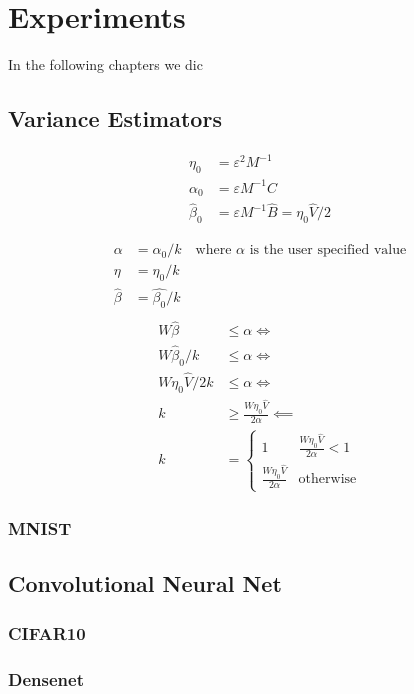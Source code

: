 \chapter{Experiments}

In the following chapters we dic

\section{Variance Estimators}


\begin{align*}
    \eta_0 &= \varepsilon^2 M^{-1} \\
    \alpha_0 &= \varepsilon M^{-1} C \\
    \hat{\beta}_0 &= \varepsilon M^{-1} \hat{B} = \eta_0\hat{V}/2
\end{align*}


\begin{align*}
    \alpha &= \alpha_0/k \quad \text{where $\alpha$ is the user specified value} \\
    \eta &= \eta_0/k  \\
    \hat{\beta} &= \hat{\beta_0}/k \\
\end{align*}
\begin{align*}
    W \hat{\beta} &\leq \alpha \Leftrightarrow\\ 
    W \hat{\beta}_0/k &\leq \alpha \Leftrightarrow\\ 
    W \eta_0 \hat{V}/2k &\leq \alpha \Leftrightarrow \\
    k &\geq \frac{W\eta_0 \hat{V}}{2 \alpha} \impliedby \\
    k &= \begin{cases}
        1 & \frac{W\eta_0 \hat{V}}{2  \alpha} < 1 \\
        \frac{W\eta_0 \hat{V}}{2 \alpha} & \text{otherwise}
    \end{cases}
\end{align*}

\subsection{MNIST}

\section{Convolutional Neural Net}
\subsection{CIFAR10}
\subsection{Densenet}


